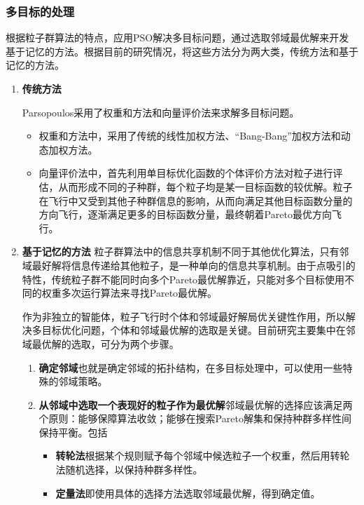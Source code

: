 \subsubsection{多目标的处理}
根据粒子群算法的特点，应用PSO解决多目标问题\cite{Campana2010Dynamic}，通过选取邻域最优解来开发基于记忆的方法。根据目前的研究情况，将这些方法分为两大类，传统方法和基于记忆的方法\cite{QU2012Differential}。
\begin{enumerate}
	\item \textbf{传统方法}
	
	Parsopoulos采用了权重和方法和向量评价法来求解多目标问题\cite{Parsopoulos2001Improving}\cite{Parsopoulos2002Recent}。
	\begin{itemize}
		\item 权重和方法中，采用了传统的线性加权方法、“Bang-Bang”加权方法和动态加权方法。
		\item 向量评价法中，首先利用单目标优化函数的个体评价方法对粒子进行评估，从而形成不同的子种群，每个粒子均是某一目标函数的较优解。粒子在飞行中又受到其他子种群信息的影响，从而向满足其他目标函数分量的方向飞行，逐渐满足更多的目标函数分量，最终朝着Pareto最优方向飞行。
	\end{itemize}
	\item \textbf{基于记忆的方法}
	粒子群算法中的信息共享机制不同于其他优化算法，只有邻域最好解将信息传递给其他粒子，是一种单向的信息共享机制。由于点吸引的特性，传统粒子群不能同时向多个Pareto最优解靠近，只能对多个目标使用不同的权重多次运行算法来寻找Pareto最优解。
	
	作为非独立的智能体，粒子飞行时个体和邻域最好解局优关键性作用，所以解决多目标优化问题，个体和邻域最优解的选取是关键。目前研究主要集中在邻域最优解的选取，可分为两个步骤。
	
	\begin{enumerate}
		\item \textbf{确定邻域}也就是确定邻域的拓扑结构，在多目标处理中，可以使用一些特殊的邻域策略。
		\item \textbf{从邻域中选取一个表现好的粒子作为最优解}邻域最优解的选择应该满足两个原则：能够保障算法收敛；能够在搜索Pareto解集和保持种群多样性间保持平衡。包括
		\begin{itemize}
			\item \textbf{转轮法}根据某个规则赋予每个邻域中候选粒子一个权重，然后用转轮法随机选择，以保持种群多样性。
			\item \textbf{定量法}即使用具体的选择方法选取邻域最优解，得到确定值。
		\end{itemize}
	\end{enumerate}
\end{enumerate}
